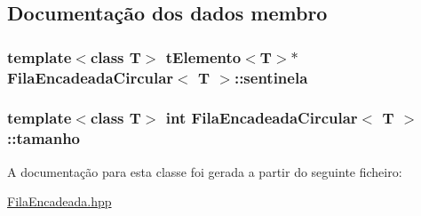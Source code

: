 \subsection{Documentação dos dados membro}
\hypertarget{class_fila_encadeada_circular_a4286760de29b4691846e8fef53459f33}{
\subsubsection[{sentinela}]{\setlength{\rightskip}{0pt plus 5cm}template$<$class T$>$ {\bf t\+Elemento}$<$T$>$$\ast$ {\bf Fila\+Encadeada\+Circular}$<$ T $>$\+::sentinela\hspace{0.3cm}{\ttfamily [protected]}}}\label{class_fila_encadeada_circular_a4286760de29b4691846e8fef53459f33}
\hypertarget{class_fila_encadeada_circular_a681be4fb4159df86faab4421fcacb099}{
\subsubsection[{tamanho}]{\setlength{\rightskip}{0pt plus 5cm}template$<$class T$>$ int {\bf Fila\+Encadeada\+Circular}$<$ T $>$\+::tamanho\hspace{0.3cm}{\ttfamily [protected]}}}\label{class_fila_encadeada_circular_a681be4fb4159df86faab4421fcacb099}


A documentação para esta classe foi gerada a partir do seguinte ficheiro\+:\begin{DoxyCompactItemize}
\item 
\hyperlink{_fila_encadeada_8hpp}{Fila\+Encadeada.\+hpp}\end{DoxyCompactItemize}
